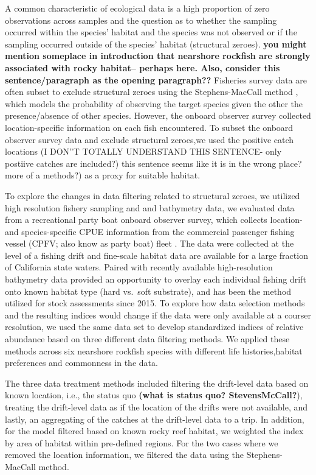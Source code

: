 \documentclass[
  12pt,
  authoryear,
  preprint,
  3p]{elsarticle}
\begin{document}
A common characteristic of ecological data is a high proportion of zero
observations across samples and the question as to whether the sampling
occurred within the species' habitat and the species was not observed or
if the sampling occurred outside of the species' habitat (structural
zeroes). \textbf{you might mention someplace in introduction that
nearshore rockfish are strongly associated with rocky habitat-- perhaps
here. Also, consider this sentence/paragraph as the opening paragraph??}
Fisheries survey data are often subset to exclude structural zeroes
using the Stephens-MacCall method \citeyearpar{Stephens:2004:MAS}, which
models the probability of observing the target species given the other
the presence/absence of other species. However, the onboard observer
survey collected location-specific information on each fish encountered.
To subset the onboard observer survey data and exclude structural
zeroes,we used the positive catch locations (I DON''T TOTALLY UNDERSTAND
THIS SENTENCE- only postiive catches are included?) this sentence seems
like it is in the wrong place? more of a methods?) as a proxy for
suitable habitat.

To explore the changes in data filtering related to structural zeroes,
we utilized high resolution fishery sampling and and bathymetry data, we
evaluated data from a recreational party boat onboard observer survey,
which collects location- and species-specific CPUE information from the
commercial passenger fishing vessel (CPFV; also know as party boat)
fleet \citep{Monk:2014:DRD}. The data were collected at the level of a
fishing drift and fine-scale habitat data are available for a large
fraction of California state waters. Paired with recently available
high-resolution bathymetry data provided an opportunity to overlay each
individual fishing drift onto known habitat type (hard vs.~soft
substrate), and has been the method utilized for stock assessments since
2015. To explore how data selection methods and the resulting indices
would change if the data were only available at a courser resolution, we
used the same data set to develop standardized indices of relative
abundance based on three different data filtering methods. We applied
these methods across six nearshore rockfish species with different life
histories,habitat preferences and commonness in the data.

The three data treatment methods included filtering the drift-level data
based on known location, i.e., the status quo \textbf{(what is status
quo? StevensMcCall?}), treating the drift-level data as if the location
of the drifts were not available, and lastly, an aggregating of the
catches at the drift-level data to a trip. In addition, for the model
filtered based on known rocky reef habitat, we weighted the index by
area of habitat within pre-defined regions. For the two cases where we
removed the location information, we filtered the data using the
Stephens-MacCall method.
\end{document}
